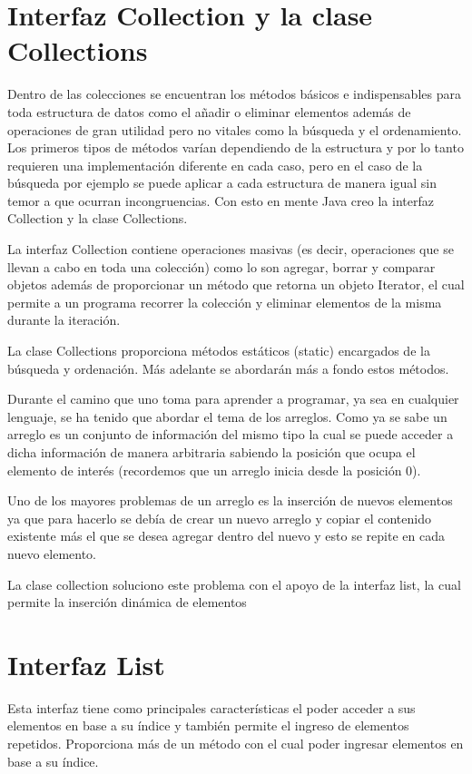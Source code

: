 \documentclass[12pt,a4paper]{report}
\begin{document}
{\section*{Interfaz Collection y la clase Collections}
Dentro de las colecciones se encuentran los métodos básicos e indispensables para toda estructura de datos como el añadir o eliminar elementos  además de operaciones de gran utilidad pero no vitales como la búsqueda y el ordenamiento. Los primeros tipos de métodos varían dependiendo de la estructura y por lo tanto requieren una implementación diferente en cada caso, pero en el caso de la búsqueda por ejemplo se puede aplicar a cada estructura de manera igual sin temor a que ocurran incongruencias. Con esto en mente Java creo la interfaz Collection y la clase Collections.

La interfaz Collection contiene operaciones masivas (es decir, operaciones que se llevan a cabo en toda una colección) como lo son agregar, borrar y comparar objetos además de proporcionar un método que retorna un objeto Iterator, el cual permite a un programa recorrer la colección y eliminar elementos de la misma durante la iteración.

La clase Collections proporciona métodos estáticos (static) encargados de la búsqueda y ordenación. Más adelante se abordarán más a fondo estos métodos.

Durante el camino que uno toma para aprender a programar, ya sea en cualquier lenguaje, se ha tenido que abordar el tema de los arreglos. Como ya se sabe un arreglo es un conjunto de información del mismo tipo la cual se puede acceder a dicha información de manera arbitraria sabiendo la posición que ocupa el elemento de interés (recordemos que un arreglo inicia desde la posición 0).

Uno de los mayores problemas de un arreglo es la inserción de nuevos elementos ya que para hacerlo se debía de crear un nuevo arreglo y copiar el contenido existente más el que se desea agregar dentro del nuevo y esto se repite en cada nuevo elemento.

La clase collection soluciono este problema con el apoyo de la interfaz list, la cual permite la inserción dinámica de elementos

\section*{Interfaz List}
Esta interfaz tiene como principales características el poder acceder a sus elementos en base a su índice y también permite el ingreso de elementos repetidos. Proporciona más de un método con el cual poder ingresar elementos en base a su índice.

}
\end{document}
